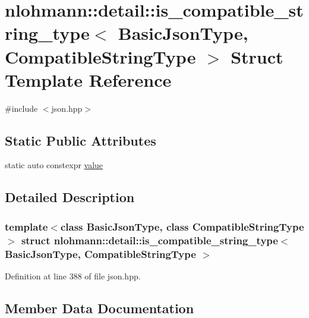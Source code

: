 \hypertarget{structnlohmann_1_1detail_1_1is__compatible__string__type}{}\section{nlohmann\+:\+:detail\+:\+:is\+\_\+compatible\+\_\+string\+\_\+type$<$ Basic\+Json\+Type, Compatible\+String\+Type $>$ Struct Template Reference}
\label{structnlohmann_1_1detail_1_1is__compatible__string__type}


{\ttfamily \#include $<$json.\+hpp$>$}

\subsection*{Static Public Attributes}
\begin{DoxyCompactItemize}
\item 
static auto constexpr \hyperlink{structnlohmann_1_1detail_1_1is__compatible__string__type_a60b198ed4c09d969a223487f23d1570d}{value}
\end{DoxyCompactItemize}


\subsection{Detailed Description}
\subsubsection*{template$<$class Basic\+Json\+Type, class Compatible\+String\+Type$>$\newline
struct nlohmann\+::detail\+::is\+\_\+compatible\+\_\+string\+\_\+type$<$ Basic\+Json\+Type, Compatible\+String\+Type $>$}



Definition at line 388 of file json.\+hpp.



\subsection{Member Data Documentation}
\mbox{\label{structnlohmann_1_1detail_1_1is__compatible__string__type_a60b198ed4c09d969a223487f23d1570d}} 
